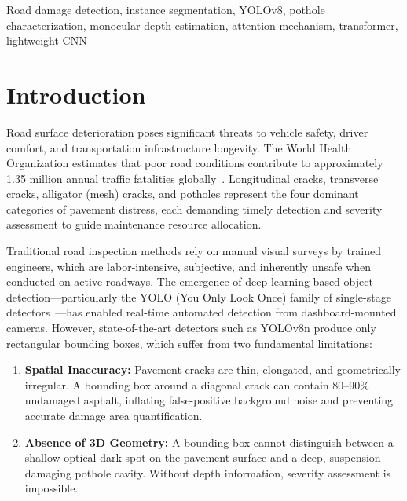 \documentclass[conference]{IEEEtran}
\begin{document}
\begin{IEEEkeywords}
Road damage detection, instance segmentation, YOLOv8, pothole characterization, monocular depth estimation, attention mechanism, transformer, lightweight CNN
\end{IEEEkeywords}


\section{Introduction}
\label{sec:introduction}

Road surface deterioration poses significant threats to vehicle safety, driver comfort, and transportation infrastructure longevity. The World Health Organization estimates that poor road conditions contribute to approximately 1.35 million annual traffic fatalities globally~\cite{who2023}. Longitudinal cracks, transverse cracks, alligator (mesh) cracks, and potholes represent the four dominant categories of pavement distress, each demanding timely detection and severity assessment to guide maintenance resource allocation.

Traditional road inspection methods rely on manual visual surveys by trained engineers, which are labor-intensive, subjective, and inherently unsafe when conducted on active roadways. The emergence of deep learning-based object detection---particularly the YOLO (You Only Look Once) family of single-stage detectors~\cite{redmon2016yolo, jocher2023yolov8}---has enabled real-time automated detection from dashboard-mounted cameras. However, state-of-the-art detectors such as YOLOv8n produce only rectangular bounding boxes, which suffer from two fundamental limitations:

\begin{enumerate}[leftmargin=*]
    \item \textbf{Spatial Inaccuracy:} Pavement cracks are thin, elongated, and geometrically irregular. A bounding box around a diagonal crack can contain 80--90\% undamaged asphalt, inflating false-positive background noise and preventing accurate damage area quantification.
    \item \textbf{Absence of 3D Geometry:} A bounding box cannot distinguish between a shallow optical dark spot on the pavement surface and a deep, suspension-damaging pothole cavity. Without depth information, severity assessment is impossible.
\end{enumerate}
\end{document}
